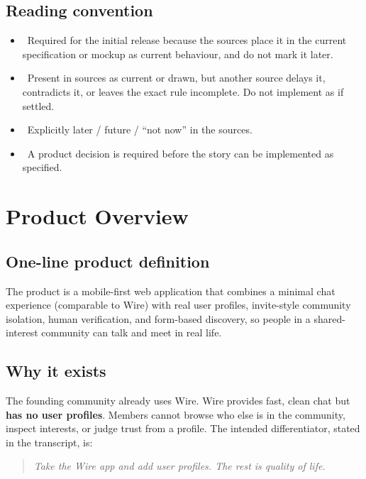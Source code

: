 \documentclass[11pt,a4paper]{article}
\newcommand{\priPzero}{\colorbox{p0}{\makebox[4.6em]{\textcolor{white}{\scriptsize\bfseries P0 V1}}}}
\newcommand{\priPone}{\colorbox{p1}{\makebox[4.6em]{\textcolor{white}{\scriptsize\bfseries P1}}}}
\newcommand{\priPtwo}{\colorbox{p2}{\makebox[4.6em]{\textcolor{white}{\scriptsize\bfseries P2 Later}}}}
\newcommand{\priTBD}{\colorbox{tbd}{\makebox[4.6em]{\textcolor{white}{\scriptsize\bfseries TBD}}}}
\begin{document}
\subsection*{Reading convention}
\begin{itemize}
  \item \priPzero\ Required for the initial release because the sources place it in the current specification or mockup as current behaviour, and do not mark it later.
  \item \priPone\ Present in sources as current or drawn, but another source delays it, contradicts it, or leaves the exact rule incomplete. Do not implement as if settled.
  \item \priPtwo\ Explicitly later / future / ``not now'' in the sources.
  \item \priTBD\ A product decision is required before the story can be implemented as specified.
\end{itemize}

\tableofcontents
\newpage

\section{Product Overview}

\subsection{One-line product definition}
The product is a mobile-first web application that combines a minimal chat experience (comparable to Wire) with real user profiles, invite-style community isolation, human verification, and form-based discovery, so people in a shared-interest community can talk and meet in real life.

\subsection{Why it exists}
The founding community already uses Wire. Wire provides fast, clean chat but \textbf{has no user profiles}. Members cannot browse who else is in the community, inspect interests, or judge trust from a profile. The intended differentiator, stated in the transcript, is:

\begin{quote}
\textit{Take the Wire app and add user profiles. The rest is quality of life.}
\end{quote}
\end{document}
